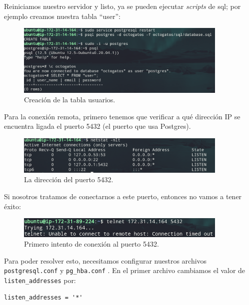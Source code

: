 \documentclass{article}
\newcommand{\ttt}[1]{%
\texttt{#1}%
}
\begin{document}
Reiniciamos nuestro servidor y listo, ya se pueden ejecutar
\textit{scripts} de sql; por ejemplo creamos nuestra tabla
``user'':

\begin{figure}[H]
  \centering
  \includegraphics[width=0.9\textwidth]{DATASERVER/exhibitE}
  \caption{Creación de la tabla usuarios.}
  \label{fig:DATASERVER-E}
\end{figure}

Para la conexión remota, primero tenemos que verificar a qué
dirección IP se encuentra ligada el puerto 5432 (el puerto
que usa Postgres).

\begin{figure}[H]
  \centering
  \includegraphics[width=0.9\textwidth]{DATASERVER/exhibitF}
  \caption{La dirección del puerto 5432.}
  \label{fig:DATASERVER-E}
\end{figure}

Si nosotros tratamos de conectarnos a este puerto, entonces no
vamos a tener éxito:

\begin{figure}[H]
  \centering
  \includegraphics[width=0.9\textwidth]{DATASERVER/exhibitG}
  \caption{Primero intento de conexión al puerto 5432.}
  \label{fig:DATASERVER-G}
\end{figure}

Para poder resolver esto, necesitamos configurar nuestros
archivos \ttt{postgresql.conf} y \ttt{pg\_hba.conf}.
En el primer archivo cambiamos el valor de
\ttt{listen\_addresses} por:

\begin{lstlisting}
listen_addresses = '*'
\end{lstlisting}
\end{document}
